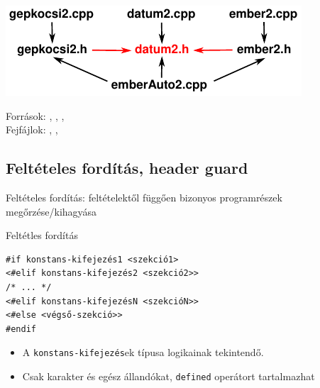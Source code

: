 \documentclass[usenames,dvipsnames,aspectratio=169]{beamer}
\begin{document}
\begin{frame}
  \begin{center}
    \includegraphics[scale=1.25]{emberAuto2.pdf}
  \end{center}
  \vfill
  Források: , , , \\
  Fejfájlok: , , \\
\end{frame}

\subsection{Feltételes fordítás, header guard}
\begin{frame}[fragile]
  Feltételes fordítás: feltételektől függően bizonyos programrészek megőrzése/kihagyása
  \begin{exampleblock}{Feltétles fordítás}
    \begin{verbatim}
#if konstans-kifejezés1 <szekció1>
<#elif konstans-kifejezés2 <szekció2>>
/* ... */
<#elif konstans-kifejezésN <szekcióN>>
<#else <végső-szekció>>
#endif
\end{verbatim}
  \end{exampleblock}
  \begin{itemize}
    \item A \texttt{konstans-kifejezés}ek típusa logikainak tekintendő.
    \item Csak karakter és egész állandókat, \texttt{defined} operátort tartalmazhat
  \end{itemize}
\end{frame}
\end{document}
